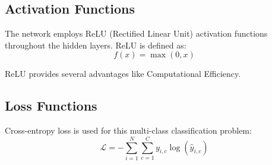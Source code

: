 \documentclass[a4paper, journal]{IEEEtran}
\begin{document}
\begin{table}[h]
    \centering
    \caption{LeNet-5 Architecture (Short Form)}
    \label{tab:lenet_arch}    
\end{table}

\subsection{Activation Functions}

The network employs ReLU (Rectified Linear Unit) activation functions throughout the hidden layers. ReLU is defined as:
\begin{equation}
    f(x) = \max(0, x)
\end{equation}

ReLU provides several advantages like Computational Efficiency.


\subsection{Loss Functions}

Cross-entropy loss is used for this multi-class classification problem:
\begin{equation}
    \mathcal{L} = -\sum_{i=1}^{N} \sum_{c=1}^{C} y_{i,c} \log(\hat{y}_{i,c})
\end{equation}
\end{document}
